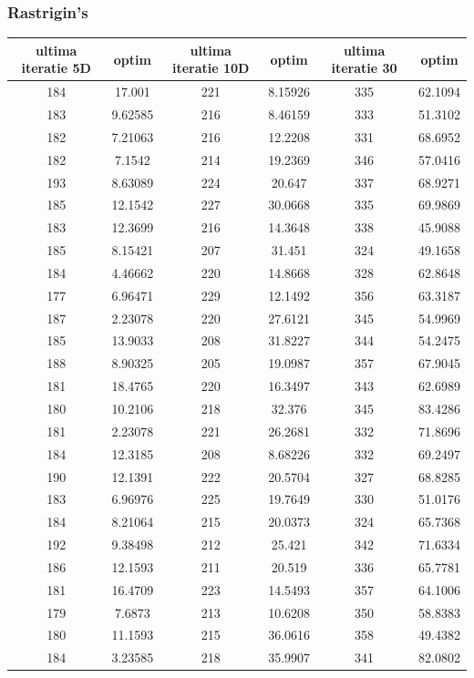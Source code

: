 \documentclass{article}
\begin{document}
\subsubsection{Rastrigin’s}
\begin{tabular}{cccccc}
\hline
ultima iteratie 5D& optim&ultima iteratie 10D& optim&ultima iteratie 30&optim\\
\hline
184&17.001&221&8.15926&335&62.1094 \\ \hline
183&9.62585&216&8.46159&333&51.3102 \\ \hline
182&7.21063&216&12.2208&331&68.6952 \\ \hline
182&7.1542&214&19.2369&346&57.0416 \\ \hline
193&8.63089&224&20.647&337&68.9271 \\ \hline
185&12.1542&227&30.0668&335&69.9869 \\ \hline
183&12.3699&216&14.3648&338&45.9088 \\ \hline
185&8.15421&207&31.451&324&49.1658 \\ \hline
184&4.46662&220&14.8668&328&62.8648 \\ \hline
177&6.96471&229&12.1492&356&63.3187 \\ \hline
187&2.23078&220&27.6121&345&54.9969 \\ \hline
185&13.9033&208&31.8227&344&54.2475 \\ \hline
188&8.90325&205&19.0987&357&67.9045 \\ \hline
181&18.4765&220&16.3497&343&62.6989 \\ \hline
180&10.2106&218&32.376&345&83.4286 \\ \hline
181&2.23078&221&26.2681&332&71.8696 \\ \hline
184&12.3185&208&8.68226&332&69.2497 \\ \hline
190&12.1391&222&20.5704&327&68.8285 \\ \hline
183&6.96976&225&19.7649&330&51.0176 \\ \hline
184&8.21064&215&20.0373&324&65.7368 \\ \hline
192&9.38498&212&25.421&342&71.6334 \\ \hline
186&12.1593&211&20.519&336&65.7781 \\ \hline
181&16.4709&223&14.5493&357&64.1006 \\ \hline
179&7.6873&213&10.6208&350&58.8383 \\ \hline
180&11.1593&215&36.0616&358&49.4382 \\ \hline
184&3.23585&218&35.9907&341&82.0802 \\ \hline

\end{tabular}
\end{document}
